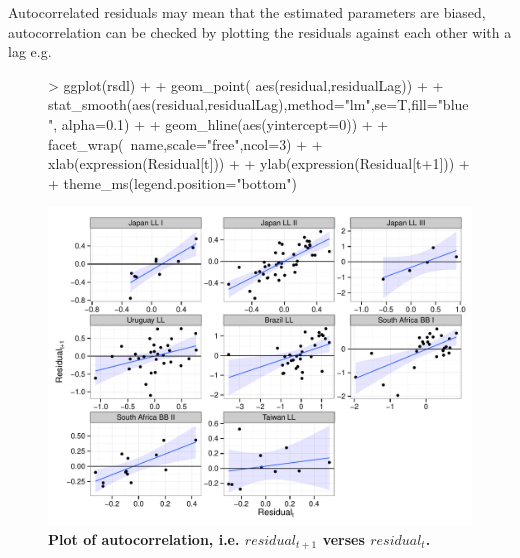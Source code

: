 \documentclass[shortnames,nojss,article]{jss}
\begin{document}
Autocorrelated residuals may mean that the estimated parameters are biased, autocorrelation can be checked by plotting the residuals against each other with a lag e.g.
\begin{figure}\begin{center}
\begin{Schunk}
\begin{Sinput}
> ggplot(rsdl)                                              +
+   geom_point( aes(residual,residualLag))                  +
+   stat_smooth(aes(residual,residualLag),method="lm",se=T,fill="blue", alpha=0.1)      +
+   geom_hline(aes(yintercept=0))                           +
+   facet_wrap(~name,scale="free",ncol=3)                   +
+   xlab(expression(Residual[t])) + 
+   ylab(expression(Residual[t+1])) +
+   theme_ms(legend.position="bottom")  
\end{Sinput}
\end{Schunk}
\includegraphics{diags-020}
\caption{\bf{Plot of autocorrelation, i.e. $residual_{t+1}$ verses $residual_{t}$.}}
\label{residual:3}
\end{center}
\end{figure}
\end{document}
